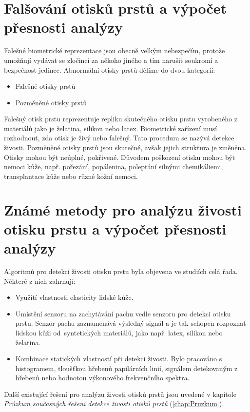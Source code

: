\section{Falšování otisků prstů a výpočet přesnosti analýzy}
Falešné biometrické reprezentace jsou obecně velkým nebezpečím, protože umožňují vydávat se zločinci za někoho jiného a tím narušit soukromí a bezpečnost jedince. Abnormální otisky prstů dělíme do dvou kategorií:
\begin{itemize}
    \item Falešné otisky prstů
    \item Pozměněné otisky prstů
\end{itemize}
Falešný otisk prstu reprezentuje repliku skutečného otisku prstu vyrobeného z materiálů jako je želatina, silikon nebo latex. Biometrické zařízení musí rozhodnout, zda otisk je živý nebo falešný. Tato procedura se nazývá detekce živosti.
Pozměněné otisky prstů jsou skutečné, avšak jejich struktura je změněna. Otisky mohou být neúplné, pokřivené. Důvodem poškození otisku mohou být nemoci kůže, např. pořezání, popálenina, poleptání silnými chemikáliemi, transplantace kůže nebo různé kožní nemoci. \cite{Petrovici}
\section{Známé metody pro analýzu živosti otisku prstu a výpočet přesnosti analýzy}
Algoritmů pro detekci živosti otisku prstu byla objevena ve studiích celá řada. Některé z nich zahrnují: \cite{AbhiskekStudy}
\begin{itemize}
    \item Využití vlastnosti elasticity lidské kůže.
    \item Umístění senzoru na zachytávání pachu vedle senzoru pro detekci otisku prstu. Senzor pachu zaznamenává výsledný signál a je tak schopen rozpoznat lidskou kůži od~syntetických materiálů, jako např. latex, silikon nebo želatina.
    \item Kombinace statických vlastností při detekci živosti. Bylo pracováno s histogramem, tloušťkou hřebenů papilárních linií, signálem detekovaným z hřebenů nebo hodnotou výkonového frekvenčního spektra.
    
\end{itemize}

Další existující řešení pro analýzu živosti otisků prstů jsou uvedené v kapitole \textit{Průzkum současných řešení detekce živosti otisků prstů} (\autoref{chap:Pruzkum}).


